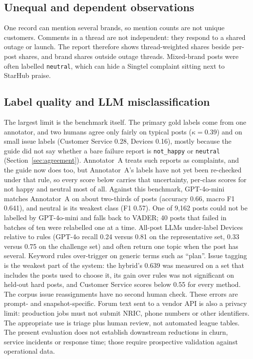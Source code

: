 \documentclass[11pt,a4paper]{article}
\begin{document}
\subsection{Unequal and dependent observations}

One record can mention several brands, so mention counts are not unique customers. Comments in a thread are not independent: they respond to a shared outage or launch. The report therefore shows thread-weighted shares beside per-post shares, and brand shares outside outage threads. Mixed-brand posts were often labelled \texttt{neutral}, which can hide a Singtel complaint sitting next to StarHub praise.

\subsection{Label quality and LLM misclassification}

The largest limit is the benchmark itself. The primary gold labels come from one annotator, and two humans agree only fairly on typical posts ($\kappa=0.39$) and on small issue labels (Customer Service 0.28, Devices 0.16), mostly because the guide did not say whether a bare failure report is \texttt{not\_happy} or \texttt{neutral} (Section~\ref{sec:agreement}). Annotator~A treats such reports as complaints, and the guide now does too, but Annotator~A's labels have not yet been re-checked under that rule, so every score below carries that uncertainty, per-class scores for not happy and neutral most of all. Against this benchmark, GPT-4o-mini matches Annotator~A on about two-thirds of posts (accuracy 0.66, macro F1 0.641), and neutral is its weakest class (F1 0.57). One of 9,162 posts could not be labelled by GPT-4o-mini and falls back to VADER; 40 posts that failed in batches of ten were relabelled one at a time. All-post LLMs under-label Devices relative to rules (GPT-4o recall 0.24 versus 0.81 on the representative set, 0.33 versus 0.75 on the challenge set) and often return one topic when the post has several. Keyword rules over-trigger on generic terms such as ``plan''. Issue tagging is the weakest part of the system: the hybrid's 0.639 was measured on a set that includes the posts used to choose it, its gain over rules was not significant on held-out hard posts, and Customer Service scores below 0.55 for every method. The corpus issue reassignments have no second human check. These errors are prompt- and snapshot-specific. Forum text sent to a vendor API is also a privacy limit: production jobs must not submit NRIC, phone numbers or other identifiers. The appropriate use is triage plus human review, not automated league tables. The present evaluation does not establish downstream reductions in churn, service incidents or response time; those require prospective validation against operational data.
\end{document}
